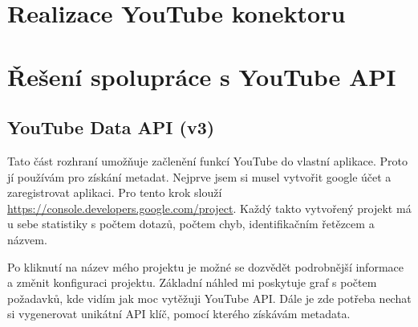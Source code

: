 \section{Realizace YouTube konektoru}
\section{Řešení spolupráce s YouTube API}
\subsection{YouTube Data API (v3)}
\par Tato část rozhraní umožňuje začlenění funkcí YouTube do vlastní aplikace. Proto jí používám pro získání metadat. Nejprve jsem si musel vytvořit google účet a zaregistrovat aplikaci. Pro tento krok slouží \url{https://console.developers.google.com/project}. Každý takto vytvořený projekt má u sebe statistiky s počtem dotazů, počtem chyb, identifikačním řetězcem a názvem. 
\par Po kliknutí na název mého projektu je možné se dozvědět podrobnější informace a změnit konfiguraci projektu. Základní náhled mi poskytuje graf s počtem požadavků, kde vidím jak moc vytěžuji YouTube API. Dále je zde potřeba nechat si vygenerovat unikátní API klíč, pomocí kterého získávám metadata.
\par 
